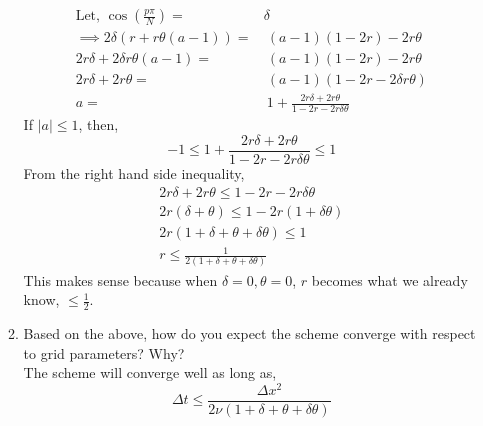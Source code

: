 \documentclass[11pt]{article}
\newcommand{\dx}{\Delta x}
\newcommand{\dt}{\Delta t}
\newcommand{\modu}[1]{\left | {#1} \right |}
\newcommand{\bra}[1]{\left(#1\right)}
\begin{document}
\begin{enumerate}
\begin{enumerate}
\begin{align*}
      \text{Let, }\cos\bra{\frac{p\pi}{N}} =& \delta \\
      \implies 2\delta\bra{r+r\theta\bra{a-1}} = & \ \bra{a-1}\bra{1-2r} -2r\theta \\
      2r\delta + 2\delta r\theta \bra{a-1} = & \ \bra{a-1}\bra{1-2r} -2r\theta \\
      2r\delta + 2r\theta = & \ \bra{a-1}\bra{1-2r - 2\delta r\theta} \\
      a = & \ 1 + \frac{2r\delta + 2r\theta}{1-2r-2r\delta \theta}
      \end{align*}
      If $\modu{a}\leq 1$, then,
      \[ 
      -1 \leq 1 + \frac{2r\delta + 2r\theta}{1-2r-2r\delta \theta} \leq 1
      \]
      From the right hand side inequality, 
      \begin{align*}
      2r\delta +2r\theta \leq 1 - 2r - 2r\delta \theta \\
      2r\bra{\delta + \theta} \leq 1- 2r\bra{1+\delta \theta} \\
      2r\bra{1+\delta + \theta + \delta \theta} \leq 1 \\
      r \leq \frac{1}{2\bra{1+\delta + \theta + \delta \theta}}
      \end{align*}
      This makes sense because when $\delta=0, \theta = 0$, $r$ becomes what we already know, $\leq \frac{1}{2}$. \\
      \item {\color{blue}Based on the above, how do you expect the scheme converge with respect to grid parameters? Why?} \\
      
      The scheme will converge well as long as, 
      \[
      \dt \leq \frac{\dx^2}{2\nu\bra{1+\delta + \theta + \delta \theta}}
      \]
    \end{enumerate}


\end{enumerate}
\end{document}
